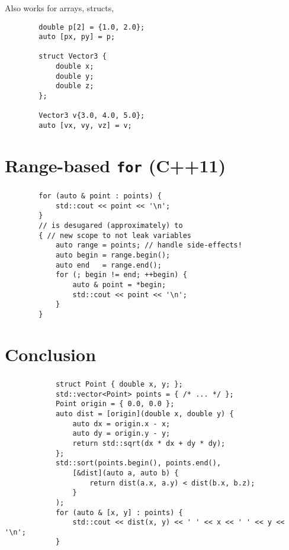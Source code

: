 \documentclass[aspectratio=43, t]{beamer}
\begin{document}
\begin{frame}[fragile]
	\frametitle{\secname}

	Also works for arrays, structs, \textellipsis
	\begin{verbatim}
		double p[2] = {1.0, 2.0};
		auto [px, py] = p;

		struct Vector3 {
			double x;
			double y;
			double z;
		};

		Vector3 v{3.0, 4.0, 5.0};
		auto [vx, vy, vz] = v;
	\end{verbatim}
\end{frame}

\section*{Range-based \texorpdfstring{\texttt{for}}{for} (C++11)}
\begin{frame}[fragile]
	\frametitle{\secname\footnotemark[1]{}}

	\begin{verbatim}
		for (auto & point : points) {
			std::cout << point << '\n';
		}
		// is desugared (approximately) to
		{ // new scope to not leak variables
			auto range = points; // handle side-effects!
			auto begin = range.begin();
			auto end   = range.end();
			for (; begin != end; ++begin) {
				auto & point = *begin;
				std::cout << point << '\n';
			}
		}
	\end{verbatim}
\end{frame}

\section*{Conclusion}
\begin{frame}[fragile]
	\frametitle{\secname}

	{\small
		\begin{verbatim}
			struct Point { double x, y; };
			std::vector<Point> points = { /* ... */ };
			Point origin = { 0.0, 0.0 };
			auto dist = [origin](double x, double y) {
				auto dx = origin.x - x;
				auto dy = origin.y - y;
				return std::sqrt(dx * dx + dy * dy);
			};
			std::sort(points.begin(), points.end(),
				[&dist](auto a, auto b) {
					return dist(a.x, a.y) < dist(b.x, b.z);
				}
			);
			for (auto & [x, y] : points) {
				std::cout << dist(x, y) << ' ' << x << ' ' << y << '\n';
			}
		\end{verbatim}
	}
\end{frame}

\end{document}
